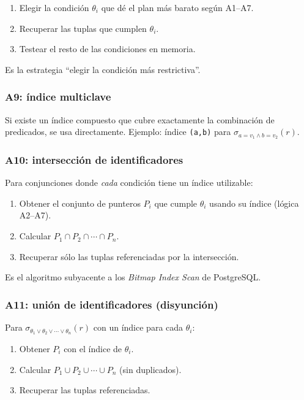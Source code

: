 \documentclass[11pt,a4paper]{article}
\newcommand{\sel}[1]{\sigma_{#1}}
\begin{document}
\begin{enumerate}
    \item Elegir la condición $\theta_i$ que dé el plan más barato según
    A1--A7.
    \item Recuperar las tuplas que cumplen $\theta_i$.
    \item Testear el resto de las condiciones en memoria.
\end{enumerate}

Es la estrategia ``elegir la condición más restrictiva''.

\subsubsection*{A9: índice multiclave}

Si existe un índice compuesto que cubre exactamente la combinación de
predicados, se usa directamente. Ejemplo: índice \texttt{(a,b)} para
$\sel{a=v_1\wedge b=v_2}(r)$.

\subsubsection*{A10: intersección de identificadores}

Para conjunciones donde \emph{cada} condición tiene un índice utilizable:

\begin{enumerate}
    \item Obtener el conjunto de punteros $P_i$ que cumple $\theta_i$ usando
    su índice (lógica A2--A7).
    \item Calcular $P_1 \cap P_2 \cap \cdots \cap P_n$.
    \item Recuperar sólo las tuplas referenciadas por la intersección.
\end{enumerate}

Es el algoritmo subyacente a los \emph{Bitmap Index Scan} de PostgreSQL.

\subsubsection*{A11: unión de identificadores (disyunción)}

Para $\sel{\theta_1 \vee \theta_2 \vee \cdots \vee \theta_n}(r)$ con un
índice para cada $\theta_i$:

\begin{enumerate}
    \item Obtener $P_i$ con el índice de $\theta_i$.
    \item Calcular $P_1 \cup P_2 \cup \cdots \cup P_n$ (sin duplicados).
    \item Recuperar las tuplas referenciadas.
\end{enumerate}
\end{document}

